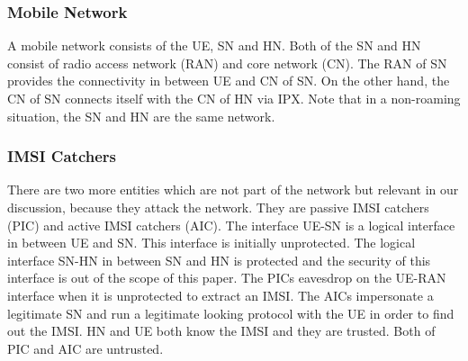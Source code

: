 \documentclass[conference]{IEEEtran}
\begin{document}
\subsubsection{Mobile Network}
A mobile network consists of the UE, SN and HN. Both of the SN and HN consist of radio access network (RAN) and core network (CN). The RAN of SN provides the connectivity in between UE and CN of SN. On the other hand, the CN of SN connects itself with the CN of HN via IPX. Note that in a non-roaming situation, the SN and HN are the same network. 

\subsubsection{IMSI Catchers}
There are two more entities which are not part of the network but relevant in our discussion, because they attack the network. They are passive IMSI catchers (PIC) and active IMSI catchers (AIC). The interface UE-SN is a logical interface in between UE and SN. This interface is initially unprotected. The logical interface SN-HN in between SN and HN is protected and the security of this interface is out of the scope of this paper. The PICs eavesdrop on the UE-RAN interface when it is unprotected to extract an IMSI. The AICs impersonate a legitimate SN and run a legitimate looking protocol with the UE in order to find out the IMSI. HN and UE both know the IMSI and they are trusted. Both of PIC and AIC are untrusted. 

\end{document}
